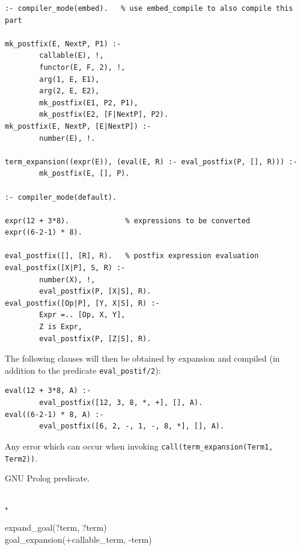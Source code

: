 \begin{Code}
\begin{verbatim}
:- compiler_mode(embed).   % use embed_compile to also compile this part

mk_postfix(E, NextP, P1) :-
        callable(E), !,
        functor(E, F, 2), !,
        arg(1, E, E1),
        arg(2, E, E2),
        mk_postfix(E1, P2, P1),
        mk_postfix(E2, [F|NextP], P2).
mk_postfix(E, NextP, [E|NextP]) :-
        number(E), !.

term_expansion((expr(E)), (eval(E, R) :- eval_postfix(P, [], R))) :-
        mk_postfix(E, [], P).

:- compiler_mode(default).

expr(12 + 3*8).             % expressions to be converted
expr((6-2-1) * 8).

eval_postfix([], [R], R).   % postfix expression evaluation
eval_postfix([X|P], S, R) :-
        number(X), !,
        eval_postfix(P, [X|S], R).
eval_postfix([Op|P], [Y, X|S], R) :-
        Expr =.. [Op, X, Y],
        Z is Expr,
        eval_postfix(P, [Z|S], R).
\end{verbatim}
\end{Code}

The following clauses will then be obtained by expansion and compiled (in addition to the
predicate \texttt{eval\_postif/2}):

\begin{Code}
\begin{verbatim}
eval(12 + 3*8, A) :-
        eval_postfix([12, 3, 8, *, +], [], A).
eval((6-2-1) * 8, A) :-
        eval_postfix([6, 2, -, 1, -, 8, *], [], A).
\end{verbatim}
\end{Code}

\Errors

Any error which can occur when invoking \texttt{call(term\_expansion(Term1,
  Term2))}.

\Portability

GNU Prolog predicate.

\subsubsection{,
               }

\begin{TemplatesOneCol}
expand\_goal(?term, ?term)\\
goal\_expansion(+callable\_term, -term)
\end{TemplatesOneCol}

